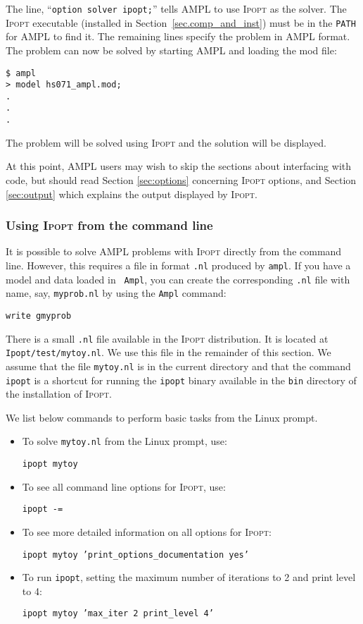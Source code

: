 \documentclass[10pt]{article}
\newcommand{\Ipopt}{\textsc{Ipopt}\xspace}
\begin{document}
The line, ``{\tt option solver ipopt;}'' tells AMPL to use \Ipopt as
the solver. The \Ipopt executable (installed in
Section~\ref{sec.comp_and_inst}) must be in the {\tt PATH} for AMPL to
find it. The remaining lines specify the problem in AMPL format. The
problem can now be solved by starting AMPL and loading the mod file:
\begin{verbatim}
$ ampl
> model hs071_ampl.mod;
.
.
.
\end{verbatim}
The problem will be solved using \Ipopt and the solution will be
displayed.

At this point, AMPL users may wish to skip the sections about
interfacing with code, but should read Section \ref{sec:options}
concerning \Ipopt options, and Section \ref{sec:output} which
explains the output displayed by \Ipopt.

\subsubsection{Using \Ipopt from the command line}

It is possible to solve AMPL problems with \Ipopt directly from
the command line. However, this requires a file in format {\tt .nl}
produced by {\tt ampl}.  If you have a model and data loaded in {\tt
  Ampl}, you can create the corresponding {\tt .nl} file with name,
say, {\tt myprob.nl} by using the {\tt Ampl} command:

{\tt write gmyprob}

There is a small {\tt .nl} file available in the \Ipopt distribution. It is
located at {\tt Ipopt/test/mytoy.nl}. 
We use this file in the remainder of this section. We assume that the file
{\tt mytoy.nl} is in the current directory and that the command 
{\tt ipopt} is a shortcut for running the {\tt ipopt} binary available
in the {\tt bin} directory of the installation of \Ipopt.

We list below commands to perform basic tasks from the Linux prompt.

\begin{itemize}
\item To solve {\tt mytoy.nl} from the Linux prompt, use:

{\tt ipopt mytoy}

\item To see all command line options for \Ipopt, use:

{\tt ipopt -=}

\item To see more detailed information on all options for \Ipopt:

{\tt ipopt mytoy 'print\_options\_documentation yes'}

\item To run {\tt ipopt}, setting the maximum number of iterations to 2 and 
print level to 4:

{\tt ipopt mytoy 'max\_iter 2 print\_level 4'}
\end{itemize}
\end{document}
